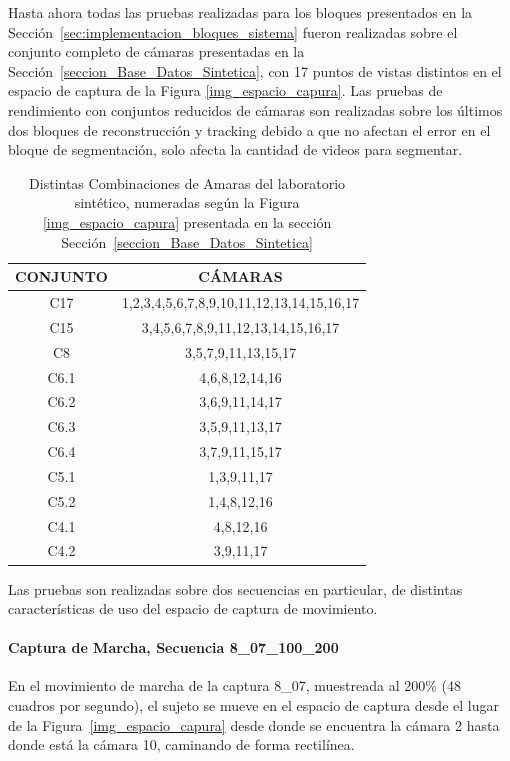 Hasta ahora todas las pruebas realizadas para los bloques presentados en la Sección~\ref{sec:implementacion_bloques_sistema} fueron realizadas sobre el conjunto completo de cámaras presentadas en la Sección~\ref{seccion_Base_Datos_Sintetica}, con 17 puntos de vistas distintos en el espacio de captura de la Figura \ref{img_espacio_capura}. Las pruebas de rendimiento con conjuntos reducidos de cámaras son realizadas sobre los últimos dos bloques de reconstrucción y tracking debido a que no afectan el error en el bloque de segmentación, solo afecta la cantidad de videos para segmentar.

\begin{table}[h]
\centering
\begin{tabular}{|c|c|}
\hline
\textbf{CONJUNTO} & \textbf{CÁMARAS} \\ \hline
C17 & 1,2,3,4,5,6,7,8,9,10,11,12,13,14,15,16,17 \\ \hline
C15 & 3,4,5,6,7,8,9,11,12,13,14,15,16,17 \\ \hline
C8 & 3,5,7,9,11,13,15,17 \\ \hline
C6.1 & 4,6,8,12,14,16 \\ \hline
C6.2 & 3,6,9,11,14,17 \\ \hline
C6.3 & 3,5,9,11,13,17 \\ \hline
C6.4 & 3,7,9,11,15,17 \\ \hline
C5.1 & 1,3,9,11,17 \\ \hline
C5.2 & 1,4,8,12,16 \\ \hline
C4.1 & 4,8,12,16 \\ \hline
C4.2 & 3,9,11,17 \\ \hline
\end{tabular}
\caption{Distintas Combinaciones de Amaras del laboratorio sintético, numeradas según la Figura \ref{img_espacio_capura} presentada en la sección Sección~\ref{seccion_Base_Datos_Sintetica} }
\end{table}

Las pruebas son realizadas sobre dos secuencias en particular, de distintas características de uso del espacio de captura de movimiento.

\paragraph{Captura de Marcha, Secuencia 8\_07\_100\_200}

En el movimiento de marcha de la captura 8\_07, muestreada al 200\% (48 cuadros por segundo), el sujeto se mueve en el espacio de captura desde el lugar de la Figura~\ref{img_espacio_capura} desde donde se encuentra la cámara 2 hasta donde está la cámara 10, caminando de forma rectilínea.

